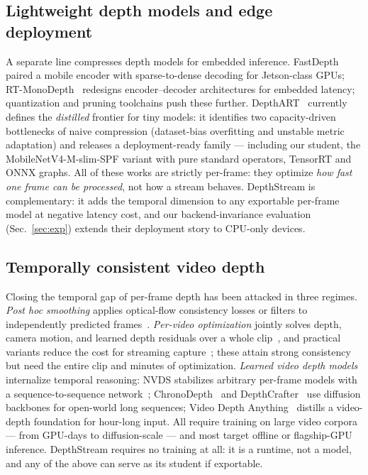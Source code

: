 \documentclass[10pt,twocolumn]{article}
\begin{document}
\subsection{Lightweight depth models and edge deployment}
A separate line compresses depth models for embedded inference.
FastDepth~\cite{fastdepth} paired a mobile encoder with sparse-to-dense
decoding for Jetson-class GPUs; RT-MonoDepth~\cite{rtmonodepth} redesigns
encoder--decoder architectures for embedded latency; quantization and
pruning toolchains push these further. DepthART~\cite{depthart} currently
defines the \emph{distilled} frontier for tiny models: it identifies two
capacity-driven bottlenecks of naive compression (dataset-bias overfitting
and unstable metric adaptation) and releases a deployment-ready family ---
including our student, the MobileNetV4-M-slim-SPF variant with pure
standard operators, TensorRT and ONNX graphs. All of these works are
strictly per-frame: they optimize \emph{how fast one frame can be
processed}, not how a stream behaves. DepthStream is complementary: it adds
the temporal dimension to any exportable per-frame model at negative
latency cost, and our backend-invariance evaluation
(Sec.~\ref{sec:exp}) extends their deployment story to CPU-only devices.

\subsection{Temporally consistent video depth}
Closing the temporal gap of per-frame depth has been attacked in three
regimes. \emph{Post hoc smoothing} applies optical-flow consistency losses or
filters to independently predicted frames~\cite{teccvideodepth}.
\emph{Per-video optimization} jointly solves depth, camera motion, and
learned depth residuals over a whole clip~\cite{cvd}, and practical variants
reduce the cost for streaming capture~\cite{practicalcvd}; these attain
strong consistency but need the entire clip and minutes of optimization.
\emph{Learned video depth models} internalize temporal reasoning: NVDS
stabilizes arbitrary per-frame models with a sequence-to-sequence
network~\cite{nvds}; ChronoDepth~\cite{chronodepth} and DepthCrafter~\cite{depthcrafter}
use diffusion backbones for open-world long sequences; Video Depth
Anything~\cite{vda} distills a video-depth foundation for hour-long input.
All require training on large video corpora --- from GPU-days to
diffusion-scale --- and most target offline or flagship-GPU inference.
DepthStream requires no training at all: it is a runtime, not a model, and
any of the above can serve as its student if exportable.
\end{document}

